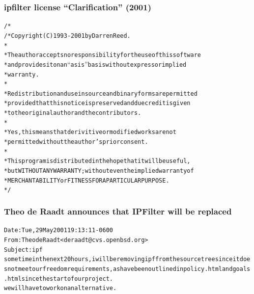 \documentclass{beamer}
\begin{document}
\begin{frame}
\frametitle{ipfilter license ``Clarification'' (2001)}

\begin{alltt}
\footnotesize
/* \\
/* Copyright (C) 1993-2001 by Darren Reed. \\
 * \\
 * The author accepts no responsibility for the use of this software \\
 * and provides it on an ``as is'' basis without express or implied \\
 *  warranty. \\
 * \\
 * Redistribution and use in source and binary forms are permitted \\
 * provided that this notice is preserved and due credit is given \\
 * to the original author and the contributors. \\
 * \\
 * \alert{Yes, this means that derivitive or modified works are not} \\ 
 * \alert{permitted without the author's prior consent.} \\
 * \\
 * This program is distributed in the hope that it will be useful, \\
 * but WITHOUT ANY WARRANTY; without even the implied warranty of \\
 * MERCHANTABILITY or FITNESS FOR A PARTICULAR PURPOSE. \\
 * /

\end{alltt}

\end{frame}


\begin{frame}
\frametitle{Theo de Raadt announces that IPFilter will be replaced}

\begin{alltt}
\footnotesize


Date: Tue, 29 May 2001 19:13:11 -0600 \\
From: Theo de Raadt <deraadt@cvs.openbsd.org> \\
Subject: ipf \\

sometime in the next 20 hours, i will be removing ipf from the source tree since it does not meet our freedom requirements, as have been outlined in policy.html and goals.html since the start of our project. \\

we will have to work on an alternative.

\end{alltt}

\end{frame}
\end{document}
